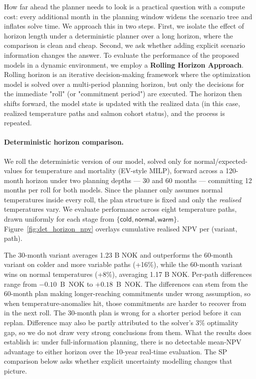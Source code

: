 \documentclass[12pt,a4paper]{article}
\begin{document}
How far ahead the planner needs to look is a practical question with a compute cost: every additional month in the planning window widens the scenario tree and inflates solve time. We approach this in two steps. First, we isolate the effect of horizon length under a deterministic planner over a long horizon, where the comparison is clean and cheap. Second, we ask whether adding explicit scenario information changes the answer. To evaluate the performance of the proposed models in a dynamic environment, we employ a \textbf{Rolling Horizon Approach}. Rolling horizon is an iterative decision-making framework where the optimization model is solved over a multi-period planning horizon, but only the decisions for the immediate "roll" (or "commitment period") are executed. The horizon then shifts forward, the model state is updated with the realized data (in this case, realized temperature paths and salmon cohort status), and the process is repeated.
 
\paragraph{Deterministic horizon comparison.}
We roll the deterministic version of our model, solved only for normal/expected-values for temperature and mortality (EV-style MILP), forward across a 120-month horizon under two planning depths --- 30 and 60 months --- committing 12 months per roll for both models. Since the planner only assumes normal temperatures inside every roll, the plan structure is fixed and only the \emph{realised} temperatures vary. We evaluate performance across eight temperature paths, drawn uniformly for each stage from $\{\textsf{cold}, \textsf{normal}, \textsf{warm}\}$. Figure~\ref{fig:det_horizon_npv} overlays cumulative realised NPV per (variant, path). 

The 30-month variant averages 1.23 B NOK and outperforms the 60-month variant on colder and more variable paths (+16\%), while the 60-month variant wins on normal temperatures (+8\%), averaging 1.17 B NOK. Per-path differences range from $-0.10$~B~NOK to $+0.18$~B~NOK. The differences can stem from the 60-month plan making longer-reaching commitments under wrong assumption, so when temperature-anomalies hit, those commitments are harder to recover from in the next roll. The 30-month plan is wrong for a shorter period before it can replan. Difference may also be partly attributed to the solver's 3\% optimality gap, so we do not draw very strong conclusions from them. What the results does establish is: under full-information planning, there is no detectable mean-NPV advantage to either horizon over the 10-year real-time evaluation. The SP comparison below asks whether explicit uncertainty modelling changes that picture.
\end{document}

